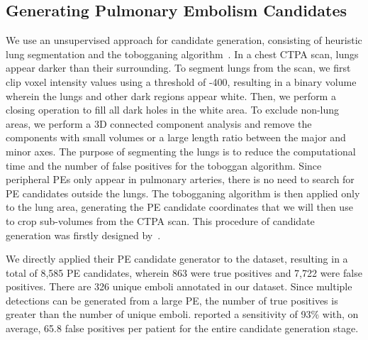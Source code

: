 \subsection{Generating Pulmonary Embolism Candidates}
\label{ch6:medical_applications:candidate_generation}

We use an unsupervised approach for candidate generation, consisting of heuristic lung segmentation and the tobogganing algorithm~\citep{fairfield1990toboggan}. In a chest CTPA scan, lungs appear darker than their surrounding. To segment lungs from the scan, we first clip voxel intensity values using a threshold of -400, resulting in a binary volume wherein the lungs and other dark regions appear white. Then, we perform a closing operation to fill all dark holes in the white area. To exclude non-lung areas, we perform a 3D connected component analysis and remove the components with small volumes or a large length ratio between the major and minor axes. The purpose of segmenting the lungs is to reduce the computational time and the number of false positives for the toboggan algorithm. Since peripheral PEs only appear in pulmonary arteries, there is no need to search for PE candidates outside the lungs. The tobogganing algorithm is then applied only to the lung area, generating the PE candidate coordinates that we will then use to crop sub-volumes from the CTPA scan. This procedure of candidate generation was firstly designed by~\citet{tajbakhsh2015computer}. 


We directly applied their PE candidate generator to the dataset, resulting in a total of 8,585 PE candidates, wherein 863 were true positives and 7,722 were false positives. There are 326 unique emboli annotated in our dataset. Since multiple detections can be generated from a large PE, the number of true positives is greater than the number of unique emboli. \citet{tajbakhsh2015computer} reported a sensitivity of 93\% with, on average, 65.8 false positives per patient for the entire candidate generation stage.


